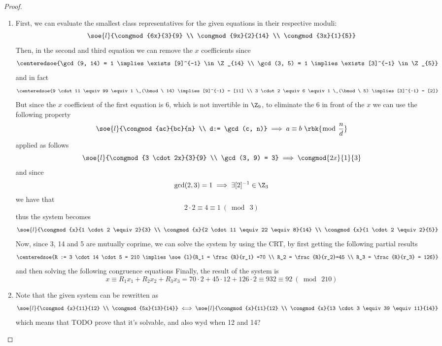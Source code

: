 \documentclass[a4paper, 12pt]{report}
\begin{document}
    \begin{proof}
        \quad
        \begin{enumerate}
            \item First, we can evaluate the smallest class representatives for the given equations in their respective moduli: $$\soe{l}{\congmod{6x}{3}{9} \\ \congmod{9x}{2}{14} \\ \congmod{3x}{1}{5}}$$ Then, in the second and third equation we can remove the $x$ coefficients since $$\centeredsoe{\gcd(9, 14) = 1 \implies \exists [9]^{-1} \in \Z_{14} \\ \gcd(3, 5) = 1 \implies \exists [3]^{-1} \in \Z_{5}}$$ and in fact $$\centeredsoe{9 \cdot 11 \equiv 99 \equiv 1 \ (\bmod \ 14) \implies [9]^{-1} = [11] \\ 3 \cdot 2 \equiv 6 \equiv 1 \ (\bmod \ 5) \implies [3]^{-1} = [2]}$$ But since the $x$ coefficient of the first equation is 6, which is not invertible in $\Z_9$, to eliminate the 6 in front of the $x$ we can use the following property $$\soe{l}{\congmod{ac}{bc}{n} \\ d:= \gcd(c, n)} \implies a \equiv b \ \rbk{\bmod \ \dfrac{n}{d}}$$ applied as follows $$\soe{l}{\congmod{3 \cdot 2x}{3}{9} \\ \gcd(3, 9) = 3} \implies \congmod{2x}{1}{3}$$ and since $$\gcd(2, 3) = 1 \implies \exists [2]^{-1} \in \Z_{3}$$ we have that $$2 \cdot 2 \equiv 4 \equiv 1 \ (\bmod \ 3)$$ thus the system becomes $$\soe{l}{\congmod{x}{1 \cdot2 \equiv 2}{3} \\ \congmod{x}{2 \cdot 11 \equiv 22 \equiv 8}{14} \\ \congmod{x}{1 \cdot 2 \equiv 2}{5}}$$ Now, since 3, 14 and 5 are mutually coprime, we can solve the system by using the CRT, by first getting the following partial results $$\centeredsoe{R := 3 \cdot 14 \cdot 5 = 210 \implies \soe{l}{R_1 = \frac{R}{r_1} =70 \\ R_2 = \frac{R}{r_2}=45 \\ R_3 = \frac{R}{r_3} = 126}}$$ and then solving the following congruence equations  Finally, the result of the system is $$x \equiv R_1x_1 + R_2x_2 + R_3x_3 = 70 \cdot 2 + 45 \cdot 12 + 126 \cdot 2 \equiv 932 \equiv 92 \ (\bmod \ 210)$$
            \item Note that the given system can be rewritten as $$\soe{l}{\congmod{x}{11}{12} \\ \congmod{5x}{13}{14}} \iff \soe{l}{\congmod{x}{11}{12} \\ \congmod{x}{13 \cdot 3 \equiv 39 \equiv 11}{14}}$$ which means that TODO prove that it's solvable, and also wyd when 12 and 14?
        \end{enumerate}
    \end{proof}
\end{document}
